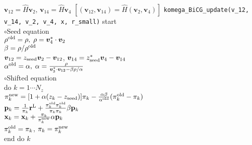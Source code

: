 \documentclass[12pt,titlepage]{article}
\renewenvironment{leftbar}{%
  \def\FrameCommand{\vrule width 1pt \hspace{0pt}}%
  \MakeFramed {\advance\hsize-\width \FrameRestore}}%
 {\endMakeFramed}
\begin{document}
${\boldsymbol v}_{1 2} = {\hat H} {\boldsymbol v}_2$, 
${\boldsymbol v}_{1 4} = {\hat H} {\boldsymbol v}_4$  
$ [({\boldsymbol v}_{1 2}, {\boldsymbol v}_{1 4}) = {\hat H}
  ({\boldsymbol v}_2, {\boldsymbol v}_4)]$
\vspace{-1em}
\begin{leftbar}
  \noindent
  \hspace{0.5cm}
  \verb|komega_BiCG_update(v_12, v_14, v_2, v_4, x, r_small)| start
  \\\hspace{1.0cm}
  $\circ$Seed equation
  \\\hspace{1.0cm}
  $\rho^{\rm old} = \rho,\; \rho = {\boldsymbol v}_4^* \cdot {\boldsymbol v}_2$
  \\\hspace{1.0cm}
  $\beta = \rho / \rho^{\rm old}$
  \\\hspace{1.0cm}
  ${\boldsymbol v}_{1 2} = z_{\rm seed} {\boldsymbol v}_2 - {\boldsymbol v}_{1 2}$, 
  ${\boldsymbol v}_{1 4} = z_{\rm seed}^* {\boldsymbol v}_4 - {\boldsymbol v}_{1 4}$
  \\\hspace{1.0cm}
  $\alpha^{\rm old} = \alpha,\; 
  \alpha = \frac{\rho}{{\boldsymbol v}_3^* \cdot {\boldsymbol v}_{1 2} - \beta \rho / \alpha }$
  \\\hspace{1.0cm}
  $\circ$Shifted equation
  \\\hspace{1.0cm}
  do $k = 1 \cdots N_z$
  \\\hspace{1.5cm}
  $\pi_k^{\rm new} = [1+\alpha(z_k-z_{\rm seed})]\pi_k - \frac{\alpha \beta}{\alpha^{\rm old}}(\pi_k^{\rm old} - \pi_k)$
  \\\hspace{1.5cm}
  ${\bf p}_{k} = \frac{1}{\pi_k} {\bf r}^{\rm L} + 
  \frac{\pi^{\rm old}_k \pi^{\rm old}_k}{\pi_k \pi_k} \beta {\bf p}_{k}$
  \\\hspace{1.5cm}
  ${\bf x}_{k} = {\bf x}_{k} + \frac{\pi_k}{\pi_k^{\rm new}} \alpha {\bf p}_{k}$
  \\\hspace{1.5cm}
  $\pi_k^{\rm old} = \pi_k$, $\pi_k = \pi_k^{\rm new}$
  \\\hspace{1.0cm}
  end do $k$
  \\\hspace{1.0cm}

\end{leftbar}
\end{document}
